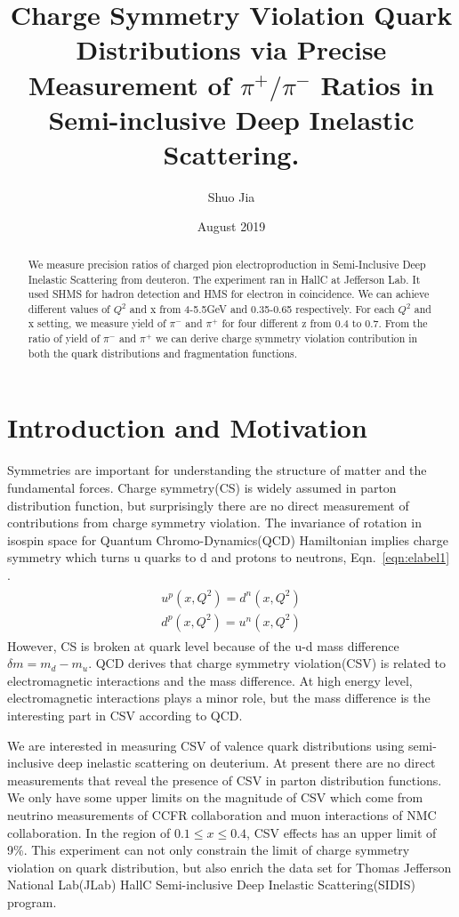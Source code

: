 \documentclass[12pt]{article}
\title{Charge Symmetry Violation Quark Distributions via Precise Measurement of $\pi^+/\pi^- $ Ratios in Semi-inclusive Deep Inelastic Scattering. }
\author{Shuo Jia}
\date{August 2019}
\begin{document}
\maketitle

\tableofcontents

\medskip

\begin{abstract}

We measure precision ratios of charged pion electroproduction in Semi-Inclusive Deep Inelastic Scattering from deuteron. The experiment ran in HallC at Jefferson Lab. It used SHMS for hadron detection and HMS for electron in coincidence. We can achieve different values of $Q^2$ and x from 4-5.5GeV and 0.35-0.65 respectively. For each $Q^2$ and x setting, we measure yield of $\pi^-$ and $\pi^+$ for four different z from 0.4 to 0.7. From the ratio of yield of $\pi^-$ and $\pi^+$ we can derive charge symmetry violation contribution in both the quark distributions and fragmentation functions.  
\end{abstract}
\section{Introduction and Motivation}
Symmetries are important for understanding the structure of matter and the fundamental forces. Charge symmetry(CS) is widely assumed in parton distribution function, but surprisingly there are no direct measurement of contributions from charge symmetry violation. The invariance of rotation in isospin space for Quantum Chromo-Dynamics(QCD) Hamiltonian implies charge symmetry which turns u quarks to d and protons to neutrons,  Eqn.~\eqref{eqn:elabel1} \cite{miller_nefkens}.
\begin{align}
\label{eqn:elabel1}
\begin{split}
   u^p(x,Q^2) = d^n(x,Q^2) 
 \\
   d^p(x,Q^2) = u^n(x,Q^2)    
\end{split}
\end{align}
However, CS is broken at quark level because of the u-d mass difference $\delta m = m_d - m_u$. QCD derives that charge symmetry violation(CSV) is related to electromagnetic interactions and the mass difference. At high energy level, electromagnetic interactions plays a minor role, but the mass difference is the interesting part in CSV according to QCD. \cite{Miller:1990ky}  

We are interested in measuring CSV of valence quark distributions using semi-inclusive deep inelastic scattering on deuterium. At present there are no direct measurements that reveal the presence of CSV in parton distribution functions. We only have some upper limits on the magnitude of CSV which come from neutrino measurements of CCFR collaboration and muon interactions of NMC collaboration\cite{Londergan:1998}\cite{PhysRevLett.66.2712}. In the region of $0.1\leq x \leq 0.4$, CSV effects has an upper limit of 9\%. This experiment can not only constrain the limit of charge symmetry violation on quark distribution, but also enrich the data set for Thomas Jefferson National Lab(JLab) HallC Semi-inclusive Deep Inelastic Scattering(SIDIS) program. 
\end{document}
